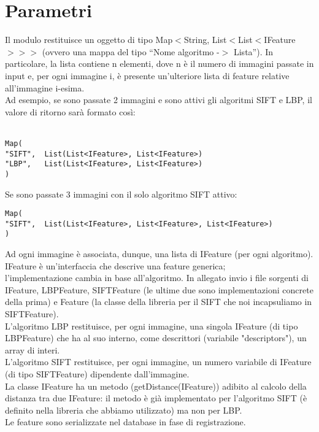 \chapter{Parametri}
Il modulo restituisce un oggetto di tipo Map$<$String, List$<$List$<$IFeature$>>>$ (ovvero una mappa del tipo ``Nome algoritmo -$>$ Lista''). In particolare, la lista contiene n elementi, dove n è il numero di immagini passate in input e, per ogni immagine i, è presente un'ulteriore lista di feature relative all'immagine i-esima.\\
Ad esempio, se sono passate 2 immagini e sono attivi gli algoritmi SIFT e LBP, il valore di ritorno sarà formato così:\\\\

\begin{lstlisting}
Map(
"SIFT",  List(List<IFeature>, List<IFeature>)
"LBP",   List(List<IFeature>, List<IFeature>)
)
\end{lstlisting}
\vspace{0.4cm}
Se sono passate 3 immagini con il solo algoritmo SIFT attivo:\\
\begin{lstlisting}
Map(
"SIFT",  List(List<IFeature>, List<IFeature>, List<IFeature>)
)
\end{lstlisting}
\vspace{0.8cm}
Ad ogni immagine è associata, dunque, una lista di IFeature (per ogni algoritmo). IFeature è un'interfaccia che descrive una feature generica;\\ l'implementazione cambia in base all'algoritmo. In allegato invio i file sorgenti di IFeature, LBPFeature, SIFTFeature (le ultime due sono implementazioni concrete della prima) e Feature (la classe della libreria per il SIFT che noi incapsuliamo in SIFTFeature).\\
L'algoritmo LBP restituisce, per ogni immagine, una singola IFeature (di tipo LBPFeature) che ha al suo interno, come descrittori (variabile "descriptors"), un array di interi.\\
L'algoritmo SIFT restituisce, per ogni immagine, un numero variabile di IFeature (di tipo SIFTFeature) dipendente dall'immagine.\\
La classe IFeature ha un metodo (getDistance(IFeature)) adibito al calcolo della distanza tra due IFeature: il metodo è già implementato per l'algoritmo SIFT (è definito nella libreria che abbiamo utilizzato) ma non per LBP.\\
Le feature sono serializzate nel database in fase di registrazione.\\